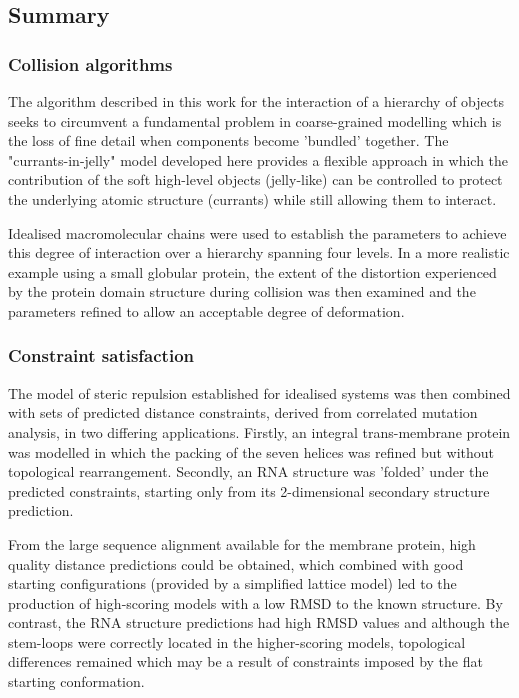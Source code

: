 \subsection{Summary}

\subsubsection{Collision algorithms}

The algorithm described in this work for the interaction of a hierarchy of objects
seeks to circumvent a fundamental problem in coarse-grained modelling which
is the loss of fine detail when components become 'bundled' together.
The "currants-in-jelly" model developed here provides a flexible approach in which
the contribution of the soft high-level objects (jelly-like) can be controlled
to protect the underlying atomic structure (currants) while still allowing
them to interact.

Idealised macromolecular chains were used to establish the parameters
to achieve this degree of interaction over a hierarchy spanning four levels.
In a more realistic example using a small globular protein, the extent of the 
distortion experienced by the protein domain structure during collision was then 
examined and the parameters refined to allow an acceptable degree of deformation.

\subsubsection{Constraint satisfaction}

The model of steric repulsion established for idealised systems was then
combined with sets of predicted distance constraints, derived from correlated
mutation analysis,  in two differing applications.    Firstly, an integral
trans-membrane protein was modelled in which the packing of the seven
helices was refined but without topological rearrangement.  Secondly,
an RNA structure was 'folded' under the predicted constraints, starting only
from its 2-dimensional secondary structure prediction.

From the large sequence alignment available for the membrane protein, high
quality distance predictions could be obtained, which combined with good
starting configurations (provided by a simplified lattice model) led to 
the production of high-scoring models with a low RMSD to the known structure.
By contrast, the RNA structure predictions had high RMSD values and although
the stem-loops were correctly located in the higher-scoring models, topological
differences remained which may be a result of constraints imposed by the
flat starting conformation.

